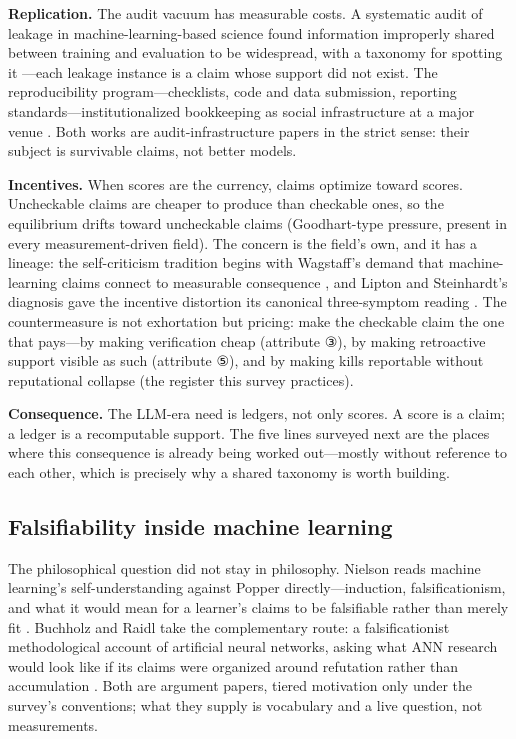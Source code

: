 \documentclass[11pt,a4paper]{article}
\begin{document}
\textbf{Replication.} The audit vacuum has measurable costs. A systematic audit of leakage in machine-learning-based science found information improperly shared between training and evaluation to be widespread, with a taxonomy for spotting it \cite{key07}—each leakage instance is a claim whose support did not exist. The reproducibility program—checklists, code and data submission, reporting standards—institutionalized bookkeeping as social infrastructure at a major venue \cite{key08}. Both works are audit-infrastructure papers in the strict sense: their subject is survivable claims, not better models.

\textbf{Incentives.} When scores are the currency, claims optimize toward scores. Uncheckable claims are cheaper to produce than checkable ones, so the equilibrium drifts toward uncheckable claims (Goodhart-type pressure, present in every measurement-driven field). The concern is the field's own, and it has a lineage: the self-criticism tradition begins with Wagstaff's demand that machine-learning claims connect to measurable consequence \cite{key25}, and Lipton and Steinhardt's diagnosis gave the incentive distortion its canonical three-symptom reading \cite{key26}. The countermeasure is not exhortation but pricing: make the checkable claim the one that pays—by making verification cheap (attribute ③), by making retroactive support visible as such (attribute ⑤), and by making kills reportable without reputational collapse (the register this survey practices).

\textbf{Consequence.} The LLM-era need is ledgers, not only scores. A score is a claim; a ledger is a recomputable support. The five lines surveyed next are the places where this consequence is already being worked out—mostly without reference to each other, which is precisely why a shared taxonomy is worth building.

\subsection{Falsifiability inside machine learning}

The philosophical question did not stay in philosophy. Nielson reads machine learning's self-understanding against Popper directly—induction, falsificationism, and what it would mean for a learner's claims to be falsifiable rather than merely fit \cite{key27}. Buchholz and Raidl take the complementary route: a falsificationist methodological account of artificial neural networks, asking what ANN research would look like if its claims were organized around refutation rather than accumulation \cite{key28}. Both are argument papers, tiered motivation only under the survey's conventions; what they supply is vocabulary and a live question, not measurements.
\end{document}
